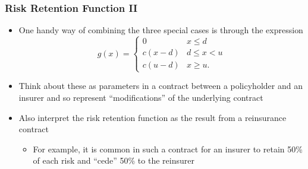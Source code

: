 \documentclass{beamer}
\begin{document}
\begin{frame}[shrink=2]
\frametitle{Risk Retention Function II}
\begin{itemize}
\item One handy way of combining the three special cases is through the expression
\begin{equation*}
g(x) =
\begin{cases}
0      & x \le d\\
c(x-d) & d \le x < u \\
c(u-d) & x \ge u .
\end{cases}
\end{equation*} \vspace{2mm}

\item Think about these as parameters in a contract between a policyholder and an insurer and so represent ``modifications'' of the underlying
contract \vspace{2mm}

\item Also interpret the risk retention function as the result from a reinsurance
contract \vspace{2mm}

\begin{itemize}
\item For example, it is common in such a contract for an insurer to retain 50\% of each risk and ``cede'' 50\% to the reinsurer
\end{itemize}
\end{itemize}
\end{frame}
\end{document}
